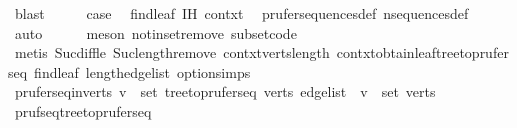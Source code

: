 \begin{isabellebody}
\ blast\isanewline
\ \ \isamarkupfalse%
\ \isamarkupfalse%
\ {\isacharquery}{\kern0pt}case\ \isamarkupfalse%
\ find{\isacharunderscore}{\kern0pt}leaf\ {\isachardoublequoteopen}{}{\isachardot}{\kern0pt}IH{\isachardoublequoteclose}\ contxt{\isacharprime}{\kern0pt}\ \isamarkupfalse%
\ prufer{\isacharunderscore}{\kern0pt}sequences{\isacharunderscore}{\kern0pt}def\ n{\isacharunderscore}{\kern0pt}sequences{\isacharunderscore}{\kern0pt}def\isanewline
\ \ \ \ \isamarkupfalse%
\ auto\isanewline
\ \ \ \ \isamarkupfalse%
\ {\isacharparenleft}{\kern0pt}meson\ notin{\isacharunderscore}{\kern0pt}set{\isacharunderscore}{\kern0pt}remove{}\ subset{\isacharunderscore}{\kern0pt}code{\isacharparenleft}{\kern0pt}{}{\isacharparenright}{\kern0pt}{\isacharparenright}{\kern0pt}\isanewline
\ \ \ \ \isamarkupfalse%
\ {\isacharparenleft}{\kern0pt}metis\ Suc{\isacharunderscore}{\kern0pt}diff{\isacharunderscore}{\kern0pt}le\ Suc{\isacharunderscore}{\kern0pt}length{\isacharunderscore}{\kern0pt}remove{}\ contxt{\isacharprime}{\kern0pt}{\isachardot}{\kern0pt}verts{\isacharunderscore}{\kern0pt}length\ contxt{\isachardot}{\kern0pt}obtain{\isacharunderscore}{\kern0pt}leaf{\isacharunderscore}{\kern0pt}tree{\isacharunderscore}{\kern0pt}to{\isacharunderscore}{\kern0pt}prufer{\isacharunderscore}{\kern0pt}seq\ find{\isacharunderscore}{\kern0pt}leaf\ length{\isacharunderscore}{\kern0pt}edge{\isacharunderscore}{\kern0pt}list\ option{\isachardot}{\kern0pt}simps{\isacharparenleft}{\kern0pt}{}{\isacharparenright}{\kern0pt}{\isacharparenright}{\kern0pt}\isanewline
{}\isamarkupfalse%
%
\endisatagproof
{\isafoldproof}%
%
\isadelimproof
\isanewline
%
\endisadelimproof
\isanewline
{}\isamarkupfalse%
\ prufer{\isacharunderscore}{\kern0pt}seq{\isacharunderscore}{\kern0pt}in{\isacharunderscore}{\kern0pt}verts{\isacharcolon}{\kern0pt}\ {\isachardoublequoteopen}v\ {\isasymin}\ set\ {\isacharparenleft}{\kern0pt}tree{\isacharunderscore}{\kern0pt}to{\isacharunderscore}{\kern0pt}prufer{\isacharunderscore}{\kern0pt}seq\ verts\ edge{\isacharunderscore}{\kern0pt}list{\isacharparenright}{\kern0pt}\ {\isasymLongrightarrow}\ v\ {\isasymin}\ set\ verts{\isachardoublequoteclose}\isanewline
%
\isadelimproof
\ \ %
\endisadelimproof
%
\isatagproof
{}\isamarkupfalse%
\ pruf{\isacharunderscore}{\kern0pt}seq{\isacharunderscore}{\kern0pt}tree{\isacharunderscore}{\kern0pt}to{\isacharunderscore}{\kern0pt}prufer{\isacharunderscore}{\kern0pt}seq\ \isamarkupfalse%

\end{isabellebody}
